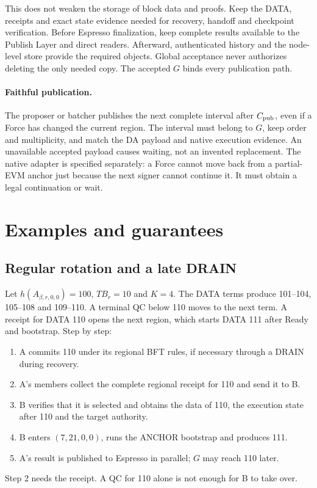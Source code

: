 \documentclass[11pt,a4paper]{article}
\newcommand{\TB}{\mathit{TB}}
\begin{document}
This does not weaken the storage of block data and proofs. Keep the DATA,
receipts and exact state evidence needed for recovery, handoff and
checkpoint verification. Before Espresso finalization, keep complete
results available to the Publish Layer and direct readers. Afterward,
authenticated history and the node-level store provide the required
objects. Global acceptance never authorizes deleting the only needed
copy. The accepted $G$ binds every publication path.

\paragraph{Faithful publication.}
The proposer or batcher publishes the next complete interval after
$C_{\rm pub}$, even if a Force has changed the current region. The
interval must belong to $G$, keep order and multiplicity, and match the DA
payload and native execution evidence. An unavailable accepted payload
causes waiting, not an invented replacement. The native adapter is
specified separately: a Force cannot move back from a partial-EVM anchor
just because the next signer cannot continue it. It must obtain a legal
continuation or wait.

\section{Examples and guarantees}
\label{sec:examples}
\subsection{Regular rotation and a late DRAIN}
\label{sec:regular-example}
Let $h(A_{\beta,r,0,0})=100$, $\TB_r=10$ and $K=4$. The DATA terms produce
101--104, 105--108 and 109--110. A terminal QC below 110 moves to the next
term. A receipt for DATA 110 opens the next region, which starts DATA 111
after Ready and bootstrap. Step by step:
\begin{enumerate}
\item A commits 110 under its regional BFT rules, if necessary through a
DRAIN during recovery.
\item A's members collect the complete regional receipt for 110 and send
it to B.
\item B verifies that it is selected and obtains the data of 110, the
execution state after 110 and the target authority.
\item B enters $(7,21,0,0)$, runs the ANCHOR bootstrap and produces 111.
\item A's result is published to Espresso in parallel; $G$ may reach 110
later.
\end{enumerate}
Step 2 needs the receipt. A QC for 110 alone is not enough for B to take
over.
\end{document}
